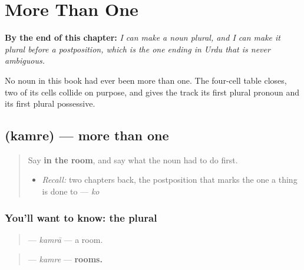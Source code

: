 
\chapter{More Than One}
\label{ch:ur-more-than-one}

\begin{chapteropening}
\textbf{By the end of this chapter:} \emph{I can make a noun plural, and I can make it plural before a postposition, which is the one ending in Urdu that is never ambiguous.}

No noun in this book had ever been more than one. The four-cell table closes, two of its cells collide on purpose, and  gives the track its first plural pronoun and its first plural possessive.
\end{chapteropening}

\section[\texorpdfstring{\ur{کمرے} (kamre)}{کمرے (kamre)}]{ (kamre) — more than one}

\label{lesson:UR-C25-plural}



\begin{quote}
Say \textbf{in the room}, and say what the noun had to do first.

\begin{itemize}
\raggedright
  \item \emph{Recall:} two chapters back, the postposition that marks the one a thing is done to — \emph{ko}
\end{itemize}
\end{quote}

\subsection*{You'll want to know: the plural}
\begin{quote}
\textbf{} — \emph{kamrā} — a room.
\end{quote}

\begin{quote}
\textbf{} — \emph{kamre} — \textbf{rooms.}
\end{quote}

